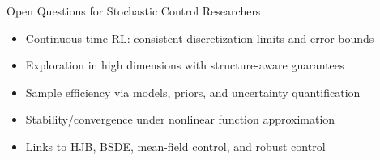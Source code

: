 \documentclass[aspectratio=169]{beamer}
\begin{document}
\begin{frame}{Open Questions for Stochastic Control Researchers}
\begin{itemize}
  \item Continuous-time RL: consistent discretization limits and error bounds
  \item Exploration in high dimensions with structure-aware guarantees
  \item Sample efficiency via models, priors, and uncertainty quantification
  \item Stability/convergence under nonlinear function approximation
  \item Links to HJB, BSDE, mean-field control, and robust control
\end{itemize}
\end{frame}
\end{document}
